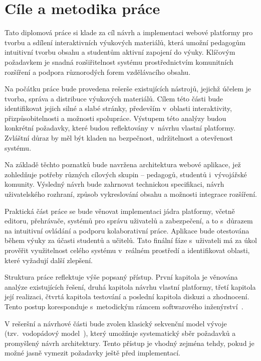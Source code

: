 \chapter*{Cíle a metodika práce}

Tato diplomová práce si klade za cíl návrh a implementaci webové platformy pro tvorbu a sdílení interaktivních výukových materiálů, která umožní pedagogům intuitivní tvorbu obsahu a studentům aktivní zapojení do výuky. 
Klíčovým požadavkem je snadná rozšiřitelnost systému prostřednictvím komunitních rozšíření a podpora různorodých forem vzdělávacího obsahu.

Na počátku práce bude provedena rešerše existujících nástrojů, jejichž účelem je tvorba, správa a distribuce výukových materiálů. 
Cílem této části bude identifikovat jejich silné a slabé stránky, především v~oblasti interaktivity, přizpůsobitelnosti a možnosti spolupráce. 
Výstupem této analýzy budou konkrétní požadavky, které budou reflektovány v~návrhu vlastní platformy. 
Zvláštní důraz by měl být kladen na bezpečnost, udržitelnost a otevřenost systému.

Na základě těchto poznatků bude navržena architektura webové aplikace, jež zohledňuje potřeby různých cílových skupin -- pedagogů, studentů i~vývojářské komunity.
Výsledný návrh bude zahrnovat technickou specifikaci, návrh uživatelského rozhraní, způsob vykreslování obsahu a možnosti integrace rozšíření.

Praktická část práce se bude věnovat implementaci jádra platformy, včetně editoru, přehrávače, systémů pro správu uživatelů a zabezpečení, a to s~důrazem na intuitivní ovládání a podporu kolaborativní práce.
Aplikace bude otestována během výuky za účasti studentů a učitelů.
Tato finální fáze s~uživateli má za úkol prověřit využitelnost celého systému v~reálném prostředí a identifikovat oblasti, které vyžadují další zlepšení.

Struktura práce reflektuje výše popsaný přístup. 
První kapitola je věnována analýze existujících řešení, druhá kapitola návrhu vlastní platformy, třetí kapitola její realizaci, čtvrtá kapitola testování a poslední kapitola diskuzi a zhodnocení. 
Tento postup koresponduje s~metodickým rámcem softwarového inženýrství~\cite{laplante2007software}.

V rešeršní a návrhové části bude zvolen klasický sekvenční model vývoje (tzv.~vodopádový model~\cite{laplante2007software}), který umožňuje systematický sběr požadavků a promyšlený návrh architektury.
Tento přístup je vhodný zejména tehdy, pokud je možné jasně vymezit požadavky ještě před implementací.

